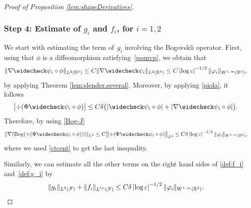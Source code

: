 \documentclass[JEP,XML,SOM,Unicode, NoEqCountersInSection,NoFloatCountersInSection,published]{cedram}
\newcommand{\R}{\mathbb{R}}
\let\eps\varepsilon
\DeclareMathOperator{\Bog}{Bog}
\theoremstyle{definition}
\theoremstyle{remark}
\begin{document}
\begin{proof}[Proof of Proposition \ref{lem:shapeDerivatives}]
\subsubsection*{Step 4: Estimate of $g_i$ and $f_i$, for $i=1,2$}
We start with estimating the term of~$g_i$ involving the Bogovski\u{\i} operator.
First, using that
$\phi$ is a diffeomorphism satisfying~\eqref{pourcp},
we obtain that
\begin{equation} \label{ctcent}
\|\nabla \widecheck \psi_i \circ \phi\|_{L^2(\R^3)} \leq C \|\nabla \widecheck \psi_i\|_{L^2(\R^3)} \leq C \left|\log \eps\right|^{-1/2} \|\varphi_i\|_{W^{1,\infty}(\R^3)},
\end{equation}
by applying Theorem \ref{lem:slender.several}.
Moreover, by applying \eqref{piola}, it follows
\begin{equation} \label{giro}
\bigl|\div (\Phi \widecheck \psi_i \circ \phi)\bigr|
\leq C {\delta} \bigl(|\widecheck \psi_i \circ \phi|
+ |\nabla \widecheck \psi_i \circ \phi|\bigr).
\end{equation}
Therefore, by using \eqref{Bog-J}
\begin{equation*}
\|\nabla(\Bog(\div(\Phi \widecheck \psi_i \circ \phi)))\|_{L^2} \leq C
\bigl\|\div(\Phi \widecheck \psi_i \circ \phi)\bigr\|_{L^2}
\leq C \delta \left|\log \eps\right|^{-1/2} \|\varphi_i\|_{W^{1,\infty}(\R^3)},
\end{equation*}
where we used
\eqref{ctcent} to get the last inequality.

Similarly, we can estimate all the other terms on the right hand sides of \eqref{def:f_i} and~\eqref{def:g_i} by
\begin{equation} \label{midi4}
\|g_i\|_{L^2(\mathcal F)} + \|f_i\|_{L^{\sfrac 6 5 }(\mathcal F)} \leq C \delta \left|\log \eps\right|^{-1/2} \| \varphi_i\|_{W^{1,\infty}(\R^3)}.
\end{equation}


\end{proof}
\end{document}
